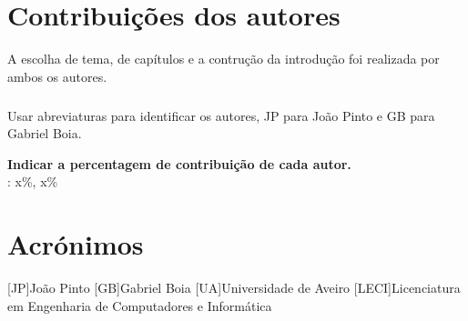 \documentclass{report}
\begin{document}
\chapter*{Contribuições dos autores}
A escolha de tema, de capítulos e a contrução da introdução foi realizada por ambos os autores.
\paragraph{} Usar abreviaturas para identificar os autores,
JP para João Pinto e GB para Gabriel Boia.

\vspace{10pt}
\textbf{Indicar a percentagem de contribuição de cada autor.}\\

\autores : x\%, x\%\\

\chapter*{Acrónimos}
\begin{acronym}
[JP]{João Pinto}
[GB]{Gabriel Boia}
[UA]{Universidade de Aveiro}
[LECI]{Licenciatura em Engenharia de Computadores e Informática}
\end{acronym}


\printbibliography
\end{document}
